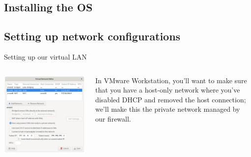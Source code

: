 \documentclass[bigger,aspectratio=169]{beamer}
\begin{document}
\subsection{Installing the OS}
\label{sec:org4390e2a}

\subsection{Setting up network configurations}
\label{sec:orgc20c062}

\begin{frame}{Setting up our virtual LAN}
  \begin{columns}
    \begin{column}{.45\textwidth}
      \vfill
      \includegraphics[width=\linewidth]{./assets/vnet-config.png}
      \vfill
    \end{column}
    \begin{column}{.45\textwidth}
      \vfill
      In VMware Workstation, you'll want to make sure that you have a host-only network
      where you've disabled DHCP and removed the host connection; we'll make this the
      private network managed by our firewall.
      \vfill
    \end{column}
  \end{columns}
\end{frame}
\end{document}
